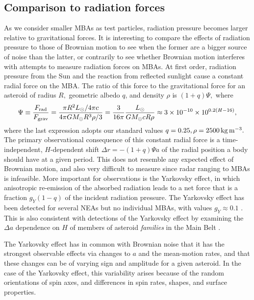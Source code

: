 \documentclass[linenumbers, onecolumn]{aastex631}
\newcommand{\eg}{\textit{e.g.\/}}
\begin{document}
\subsection{Comparison to radiation forces}
As we consider smaller MBAs as test particles, radiation pressure becomes larger relative to gravitational forces.  It is interesting to compare the effects of radiation pressure to those of Brownian motion to see when the former are a bigger source of noise than the latter, or contrarily to see whether Brownian motion interferes with attempts to measure radiation forces on MBAs.  At first order, radiation pressure from the Sun and the reaction from reflected sunlight cause a constant radial force on the MBA.  The ratio of this force to the gravitational force for an asteroid of radius $R,$ geometric albedo $q$, and density $\rho$ is $(1+q)\Psi,$ where
\begin{equation}
 \Psi \equiv \frac{F_{\rm rad}}{F_{\rm grav}} = \frac{\pi R^2 L_\odot/4\pi c}{4\pi GM_\odot R^3\rho/3}
   = \frac{3}{16\pi} \frac{L_\odot}{GM_\odot c R \rho} \approx
   3\times10^{-10} \times 10^{0.2(H-16)},
\end{equation}
where the last expression adopts our standard values $q=0.25,
\rho=2500\,{\rm kg}\, {\rm m}^{-3}.$ The primary observational consequence of
this constant radial force is a time-independent, $H$-dependent 
shift $\Delta r = -(1+q)\Psi a$ of the radial position a body should
have at a given period.  
This does not resemble
any expected effect of Brownian motion, and also very difficult to
measure since radar ranging to MBAs is infeasible.  More important for
observations is the
Yarkovsky effect, in which anisotropic re-emission of the absorbed
radiation leads to a net force that is a fraction $g_Y(1-q)$ of the incident radiation pressure.  The Yarkovsky effect has been detected for several NEAs but no individual MBAs, with values $g_Y \approx 0.1$ \citep[Yarkovsky effect and data are review by][]{yarkovsky}.  This is also consistent with detections of the Yarkovsky effect by examining the $\Delta a$ dependence on $H$ of members of asteroid \emph{families} in the Main Belt \citep[\eg][]{karin}.

 The Yarkovsky effect has in common with Brownian noise that it has the strongest observable effects via changes to $a$ and the mean-motion rates, and that these changes can be of varying sign and amplitude for a given asteroid.  In the case of the Yarkovsky effect, this variability arises because of the random orientations of spin axes, and differences in spin rates, shapes, and surface properties.  
 
\end{document}
